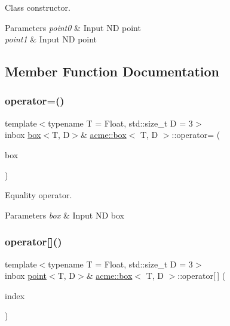 Class constructor. 


\begin{DoxyParams}{Parameters}
{\em point0} & Input ND point \\
\hline
{\em point1} & Input ND point \\
\hline
\end{DoxyParams}


\subsection{Member Function Documentation}
\mbox{\label{classacme_1_1box_ae92bb848da92cb2919416eb319e631b9}} 
\subsubsection{\texorpdfstring{operator=()}{operator=()}}
{\footnotesize\ttfamily template$<$typename T = Float, std\+::size\+\_\+t D = 3$>$ \\
inbox \hyperlink{classacme_1_1box}{box}$<$T, D$>$\& \hyperlink{classacme_1_1box}{acme\+::box}$<$ T, D $>$\+::operator= (\begin{DoxyParamCaption}\item[{const \hyperlink{classacme_1_1box}{box}$<$ T, D $>$ \&}]{box }\end{DoxyParamCaption})\hspace{0.3cm}{\ttfamily [inline]}}



Equality operator. 


\begin{DoxyParams}{Parameters}
{\em box} & Input ND box \\
\hline
\end{DoxyParams}
\mbox{\label{classacme_1_1box_a8f22d14fe8194fb76d541cc1222bceb8}} 
\subsubsection{\texorpdfstring{operator[]()}{operator[]()}\hspace{0.1cm}{\footnotesize\ttfamily [1/2]}}
{\footnotesize\ttfamily template$<$typename T = Float, std\+::size\+\_\+t D = 3$>$ \\
inbox \hyperlink{classacme_1_1point}{point}$<$T, D$>$\& \hyperlink{classacme_1_1box}{acme\+::box}$<$ T, D $>$\+::operator\mbox{[}$\,$\mbox{]} (\begin{DoxyParamCaption}\item[{const std\+::size\+\_\+t \&}]{index }\end{DoxyParamCaption})\hspace{0.3cm}{\ttfamily [inline]}}



